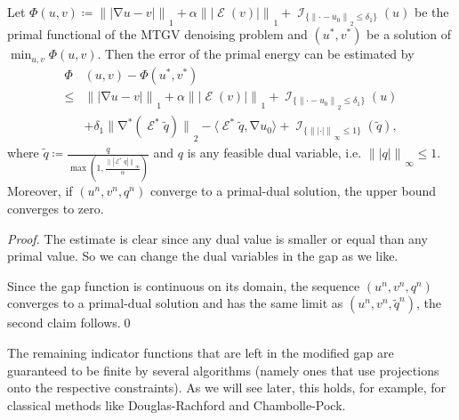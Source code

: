 \documentclass[twocolumn,envcountsame]{svjour3}
\newcommand{\norm}[2][]{{\|{#2}\|_{}}_{#1}}
\newcommand{\abs}[1]{|#1|}
\DeclareMathOperator{\ind}{\mathcal{I}}
\DeclareMathOperator{\grad}{\nabla}
\DeclareMathOperator{\symgrad}{\mathcal{E}}
\begin{document}
\begin{lemma}\label{le:gapmtgv}
  Let $\Phi(u,v)\coloneqq\norm[1]{\abs{\grad u - v}} + 
  \alpha\norm[1]{\abs{\symgrad(v)}}
  +\ind_{\{\norm[2]{\cdot-u_0}\leq \delta_1\}}(u)$ be the primal functional of the
  MTGV denoising problem and $(u^*,v^*)$ be a solution of $\min_{u,v}\Phi(u,v)$. Then the
  error of the primal energy can be estimated by
  \begin{equation*}
    \begin{split}
      \Phi&(u,v)-\Phi(u^*,v^*)\\
      \leq &\norm[1]{\abs{\grad u - v}} + 
      \alpha\norm[1]{\abs{\symgrad(v)}}
      +\ind_{\{\norm[2]{\cdot-u_0}\leq \delta_1\}}(u)\\
      &+\delta_1\norm[2]{\grad^* (\symgrad^*\tilde q)} - \langle \symgrad^*\tilde q, \grad
      u_0\rangle + \ind_{\{\norm[\infty]{\abs{\cdot}}\leq 1\}}(\tilde q),
    \end{split}
  \end{equation*}
  where $\tilde
  q\coloneqq\frac{q}{\max\left(1,\frac{\norm[\infty]{\abs{\symgrad^*q}}}{\alpha}\right)}$ and $q$ is any feasible dual variable, i.e. $\norm[\infty]{\abs{q}}\leq 1$.
  Moreover, if $(u^{n},v^{n},q^{n})$ converge to a primal-dual solution, the upper bound converges to zero.
\end{lemma}
\begin{proof}
  The estimate is clear since any dual value is smaller or equal than any primal value. So we can change
  the dual variables in the gap as we like.
  
  Since the gap function is continuous on its domain, the sequence $(u^{n},v^{n},q^{n})$ converges to a primal-dual solution and has the same limit as $(u^{n},v^{n},\tilde q^{n})$, the second claim follows.\qed
\end{proof}
The remaining indicator functions that are left in the modified gap are guaranteed to be finite by several algorithms (namely ones that use projections onto the respective constraints).
As we will see later, this holds, for example, for classical methods like
Douglas-Rachford and Chambolle-Pock.
\end{document}
